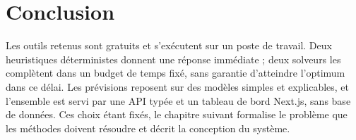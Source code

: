 \section*{Conclusion}
Les outils retenus sont gratuits et s'exécutent sur un poste de travail. Deux heuristiques déterministes donnent une réponse immédiate ; deux solveurs les complètent dans un budget de temps fixé, sans garantie d'atteindre l'optimum dans ce délai. Les prévisions reposent sur des modèles simples et explicables, et l'ensemble est servi par une API typée et un tableau de bord Next.js, sans base de données. Ces choix étant fixés, le chapitre suivant formalise le problème que les méthodes doivent résoudre et décrit la conception du système.
